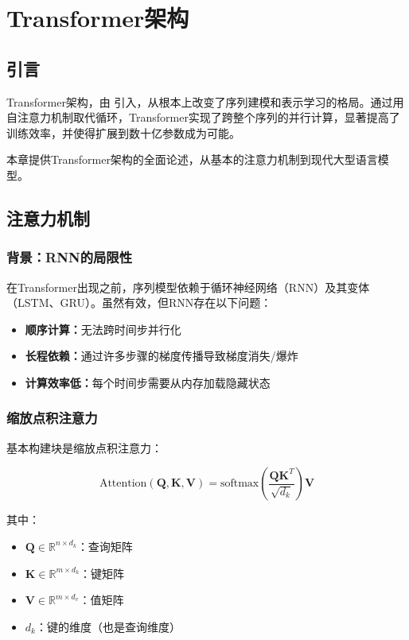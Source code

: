 \clearpage
\cleardoublepage

\chapter{Transformer架构}

\section{引言}

Transformer架构，由 \cite{vaswani2017attention} 引入，从根本上改变了序列建模和表示学习的格局。通过用自注意力机制取代循环，Transformer实现了跨整个序列的并行计算，显著提高了训练效率，并使得扩展到数十亿参数成为可能。

本章提供Transformer架构的全面论述，从基本的注意力机制到现代大型语言模型。

\section{注意力机制}

\subsection{背景：RNN的局限性}

在Transformer出现之前，序列模型依赖于循环神经网络（RNN）及其变体（LSTM、GRU）。虽然有效，但RNN存在以下问题：
\begin{itemize}
    \item \textbf{顺序计算：}无法跨时间步并行化
    \item \textbf{长程依赖：}通过许多步骤的梯度传播导致梯度消失/爆炸
    \item \textbf{计算效率低：}每个时间步需要从内存加载隐藏状态
\end{itemize}

\subsection{缩放点积注意力}

基本构建块是缩放点积注意力：

\begin{equation}
\text{Attention}(\mathbf{Q}, \mathbf{K}, \mathbf{V}) = \text{softmax}\left(\frac{\mathbf{Q}\mathbf{K}^T}{\sqrt{d_k}}\right)\mathbf{V}
\label{eq:attention}
\end{equation}

其中：
\begin{itemize}
    \item $\mathbf{Q} \in \mathbb{R}^{n \times d_k}$：查询矩阵
    \item $\mathbf{K} \in \mathbb{R}^{m \times d_k}$：键矩阵
    \item $\mathbf{V} \in \mathbb{R}^{m \times d_v}$：值矩阵
    \item $d_k$：键的维度（也是查询维度）
\end{itemize}

